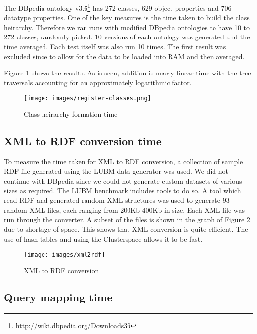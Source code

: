 \documentclass[journal]{IEEEtran}
\begin{document}
The DBpedia ontology
v3.6\footnote{http://wiki.dbpedia.org/Downloads36} has 272 classes, 629 object
properties and 706 datatype properties. One of the key measures is the time
taken to build the class heirarchy. Therefore we ran runs with modified DBpedia
ontologies to have
10 to 272 classes, randomly picked. 10 versions of each ontology was generated
and the time averaged. Each test itself was also run 10 times. The first
result was excluded since to allow for the data to be loaded into RAM and
then averaged.

Figure \ref{fig:eval:cs-ch-form} shows the results. As is seen, addition is
nearly linear time with the tree traversals
accounting for an approximately logarithmic factor.

\begin{figure}[h]
    \centering
    \texttt{[image: images/register-classes.png]}
    \caption{Class heirarchy formation time}
    \label{fig:eval:cs-ch-form}
\end{figure}

\subsection{XML to RDF conversion time}

To measure the time taken for XML to RDF conversion, a collection of sample RDF
file generated using the LUBM data generator was used. We did not continue with
DBpedia since we could not generate custom datasets of various sizes as
required. The LUBM benchmark includes tools to do so. A tool which read RDF and
generated random XML structures was used to generate 93 random XML files, each
ranging from 200Kb-400Kb in size.  Each XML file was run through the converter.
A subset of the files is shown in the graph of Figure \ref{fig:eval:xml2rdf}
due to shortage of space.  This shows that XML conversion is quite efficient.
The use of hash tables and using the Clusterspace allows it to be fast.

\begin{figure}[h]
    \centering
    \texttt{[image: images/xml2rdf]}
    \caption{XML to RDF conversion}
    \label{fig:eval:xml2rdf}
\end{figure}

\subsection{Query mapping time}
\end{document}
